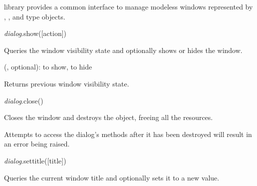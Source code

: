 \documentclass[a4paper,12pt,twoside,extrafontsizes]{memoir}
\begin{document}
\begin{funcdescr}
	 library provides a common interface to manage modeless windows represented by , ,  and  type objects.
\end{funcdescr}


\begin{luafuncprototype}
\emph{dialog}.show([action])
\end{luafuncprototype}

\begin{funcdescr}
	Queries the window visibility state and optionally shows or hides the window.
\end{funcdescr}

\begin{funcparams}
	 (, optional):  to show,  to hide
\end{funcparams}

\begin{funcret}
	Returns previous window visibility state.
\end{funcret}


\begin{luafuncprototype}
\emph{dialog}.close()
\end{luafuncprototype}

\begin{funcdescr}
	Closes the window and destroys the object, freeing all the resources.
\end{funcdescr}

\begin{funcremarks}
	Attempts to access the dialog's methods after it has been destroyed will result in an error being raised.
\end{funcremarks}


\begin{luafuncprototype}
\emph{dialog}.settitle([title])
\end{luafuncprototype}

\begin{funcdescr}
	Queries the current window title and optionally sets it to a new value.
\end{funcdescr}
\end{document}

